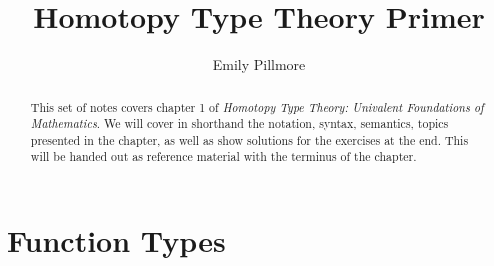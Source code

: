 \documentclass[letterpaper, 10 pt, conference]{ieeeconf}  %
\title{\LARGE \bf
Homotopy Type Theory Primer
}
\author{Emily Pillmore}
\begin{document}
\maketitle
\thispagestyle{empty}
\pagestyle{empty}


\begin{abstract}

This set of notes covers chapter 1 of \textit{Homotopy Type Theory: Univalent Foundations of Mathematics}. We will cover in shorthand the notation, syntax, semantics, topics presented in the chapter, as well as show solutions for the exercises at the end. This will be handed out as reference material with the terminus of the chapter. 

\end{abstract}


\section{Function Types}
\end{document}
